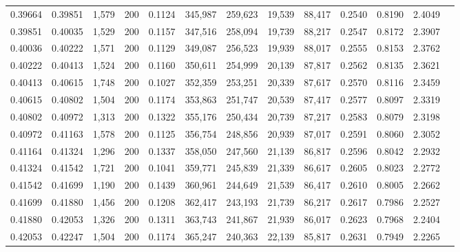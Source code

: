 \begin{tabular}{rrrrrrrrrrrrr}
0.39664 & 0.39851 &  1,579 & 200 &                                     0.1124 & 345,987 & 259,623 &  19,539 &  88,417 & 0.2540 & 0.8190 & 2.4049 \\
0.39851 & 0.40035 &  1,529 & 200 &                                     0.1157 & 347,516 & 258,094 &  19,739 &  88,217 & 0.2547 & 0.8172 & 2.3907 \\
0.40036 & 0.40222 &  1,571 & 200 &                                     0.1129 & 349,087 & 256,523 &  19,939 &  88,017 & 0.2555 & 0.8153 & 2.3762 \\
0.40222 & 0.40413 &  1,524 & 200 &                                     0.1160 & 350,611 & 254,999 &  20,139 &  87,817 & 0.2562 & 0.8135 & 2.3621 \\
0.40413 & 0.40615 &  1,748 & 200 &                                     0.1027 & 352,359 & 253,251 &  20,339 &  87,617 & 0.2570 & 0.8116 & 2.3459 \\
0.40615 & 0.40802 &  1,504 & 200 &                                     0.1174 & 353,863 & 251,747 &  20,539 &  87,417 & 0.2577 & 0.8097 & 2.3319 \\
0.40802 & 0.40972 &  1,313 & 200 &                                     0.1322 & 355,176 & 250,434 &  20,739 &  87,217 & 0.2583 & 0.8079 & 2.3198 \\
0.40972 & 0.41163 &  1,578 & 200 &                                     0.1125 & 356,754 & 248,856 &  20,939 &  87,017 & 0.2591 & 0.8060 & 2.3052 \\
0.41164 & 0.41324 &  1,296 & 200 &                                     0.1337 & 358,050 & 247,560 &  21,139 &  86,817 & 0.2596 & 0.8042 & 2.2932 \\
0.41324 & 0.41542 &  1,721 & 200 &                                     0.1041 & 359,771 & 245,839 &  21,339 &  86,617 & 0.2605 & 0.8023 & 2.2772 \\
0.41542 & 0.41699 &  1,190 & 200 &                                     0.1439 & 360,961 & 244,649 &  21,539 &  86,417 & 0.2610 & 0.8005 & 2.2662 \\
0.41699 & 0.41880 &  1,456 & 200 &                                     0.1208 & 362,417 & 243,193 &  21,739 &  86,217 & 0.2617 & 0.7986 & 2.2527 \\
0.41880 & 0.42053 &  1,326 & 200 &                                     0.1311 & 363,743 & 241,867 &  21,939 &  86,017 & 0.2623 & 0.7968 & 2.2404 \\
0.42053 & 0.42247 &  1,504 & 200 &                                     0.1174 & 365,247 & 240,363 &  22,139 &  85,817 & 0.2631 & 0.7949 & 2.2265 \\

\end{tabular}

